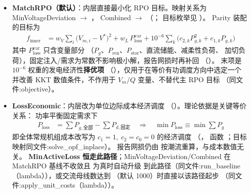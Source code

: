 \begin{itemize}
  \item \textbf{MatchRPO（默认）}：内层直接最小化 RPO 目标。映射关系为
        MinVoltageDeviation $\to$ ，
        Combined $\to$ 
        （；
        目标枚举见 ）。
        Parity 装配的目标为
        \begin{align*}
        f_{\mathrm{inner}} &= w_V\sum_{i}\bigl(V_{m,i}-V^{*}\bigr)^{2}
          + w_L\,P_{\mathrm{loss}}^{\mathrm{var}}
          + 10^{-6}\sum_{k}\bigl(c_{2,k}P_{g,k}^{2}+c_{1,k}P_{g,k}\bigr)
        \end{align*}
        其中 $P_{\mathrm{loss}}^{\mathrm{var}}$ 只含变量部分
        （$P_g$、$P_{\mathrm{ren}}$、$P_{\mathrm{stor}}$、直流储能、减柔性负荷、
        加切负荷），固定注入/需求为常数不影响极小解，报告网损时再补回
        （）。
        末项是 $10^{-6}$ 权重的发电经济性\textbf{择优项}
        （），仅用于在等价有功调度方向中选定一个
        并改善 KKT 数值条件，不作用于 $V_m/Q$ 变量、不替代主 RPO 目标
        （同文件:objective）。
  \item \textbf{LossEconomic}：内层改为单位边际成本经济调度
        （）。理论依据是关键等价关系：
        功率平衡固定需求下
        \begin{align*}
        P_{\mathrm{loss}} &= \sum P_{g,\text{全部}} - \sum P_{d,\text{固定}}
        \quad\Longrightarrow\quad
        \min P_{\mathrm{loss}} \equiv \min \sum P_g
        \end{align*}
        即全体常规机组成本改写为 $c_1=1,\;c_2=c_0=0$ 的经济调度
        （，
        函数 ；目标映射同文件:solve\_opf\_inplace）。
        报告网损仍由  按潮流重算，与成本数值无关。
        \textbf{MinActiveLoss 恒走此路径}；MinVoltageDeviation/Combined 在
        MatchRPO 基线不收敛且  为真时自动升级
        到此路径（同文件:run\_baseline（lambda）），或交流母线数达到
        （默认 1000）时直接以该路径起步
        （同文件:apply\_unit\_costs（lambda））。
\end{itemize}

